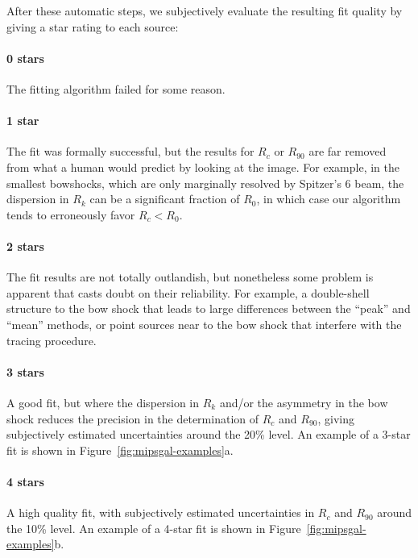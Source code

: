 \label{sec:subj-eval-fit}
After these automatic steps, we subjectively evaluate the resulting
fit quality by giving a star rating to each source:

\paragraph*{0 stars} The fitting algorithm failed for some reason. 

\paragraph*{1 star} The fit was formally successful, but the results
for \(R_c\) or \(R_{90}\) are far removed from what a human would
predict by looking at the image.  For example, in the smallest
bowshocks, which are only marginally resolved by Spitzer's 6\arcsec{}
beam, the dispersion in \(R_k\) can be a significant fraction of
\(R_0\), in which case our algorithm tends to erroneously favor
\(R_c < R_0\).

\paragraph*{2 stars} The fit results are not totally outlandish, but
nonetheless some problem is apparent that casts doubt on their
reliability.  For example, a double-shell structure to the bow shock
that leads to large differences between the ``peak'' and ``mean''
methods, or point sources near to the bow shock that interfere with
the tracing procedure.
  
\paragraph*{3 stars} A good fit, but where the dispersion in \(R_k\)
and/or the asymmetry in the bow shock reduces the precision in the
determination of \(R_c\) and \(R_{90}\), giving subjectively estimated
uncertainties around the 20\% level.  An example of a 3-star fit is
shown in Figure~\ref{fig:mipsgal-examples}a.

\paragraph*{4 stars} A high quality fit, with subjectively estimated
uncertainties in \(R_c\) and \(R_{90}\) around the 10\% level. An
example of a 4-star fit is shown in
Figure~\ref{fig:mipsgal-examples}b.

